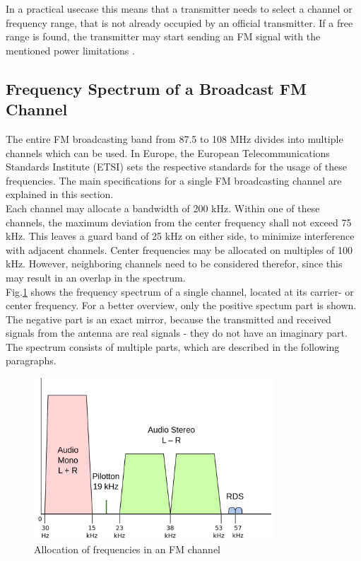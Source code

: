 In a practical usecase this means that a transmitter needs to select a channel or frequency range, that is not already occupied by an official transmitter.
If a free range is found, the transmitter may start sending an FM signal with the mentioned power limitations \cite{ref_ebu_fm_modulators_in_europe_power_regulations}.



\subsection{Frequency Spectrum of a Broadcast FM Channel}

The entire FM broadcasting band from 87.5 to 108 MHz divides into multiple channels which can be used.
In Europe, the European Telecommunications Standards Institute (ETSI) sets the respective standards for the usage of these frequencies.
The main specifications for a single FM broadcasting channel are explained in this section.\\

Each channel may allocate a bandwidth of 200 kHz.
Within one of these channels, the maximum deviation from the center frequency shall not exceed 75 kHz.
This leaves a guard band of 25 kHz on either side, to minimize interference with adjacent channels.
Center frequencies may be allocated on multiples of 100 kHz.
However, neighboring channels need to be considered therefor, since this may result in an overlap in the spectrum.\\

Fig.\ref{fig_channel_baseband_freqs} shows the frequency spectrum of a single channel, located at its carrier- or center frequency.
For a better overview, only the positive spectum part is shown.
The negative part is an exact mirror, because the transmitted and received signals from the antenna are real signals - they do not have an imaginary part.
The spectrum consists of multiple parts, which are described in the following paragraphs.

\begin{figure}[!h]
  \centering
    \includegraphics[width=9cm]{img/fm-channel-baseband.png}
  \caption{Allocation of frequencies in an FM channel \cite{ref_fig_channel_freqs}}
  \label{fig_channel_baseband_freqs}
\end{figure}

